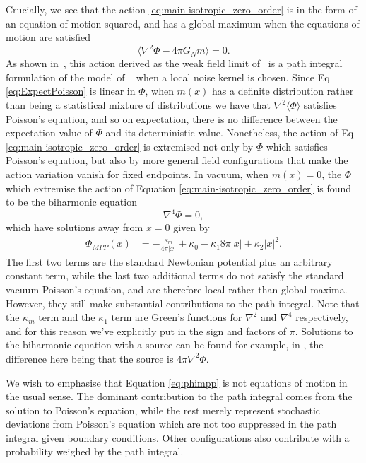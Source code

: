 \documentclass[aps,pra,amsmath,amssymb,amsthm,floatfix,nofootinbib,notitlepage,superscriptaddress,10pt]{revtex4-2}
\begin{document}
Crucially, we see that the action \eqref{eq:main-isotropic_zero_order} is in the form of an equation of motion squared, and has a global maximum when the equations of motion are satisfied
\begin{equation}
   \langle \nabla^2\Phi -4\pi G_N m\rangle=0.
    \label{eq:ExpectPoisson}
\end{equation}
As shown in~\cite{layton2023weak}, this action derived as the weak field limit of~\cite{oppenheim2018post,oppenheim2023covariant} is a path integral formulation of the model of ~\cite{tilloy2016sourcing} when a local noise kernel is chosen.
Since Eq \eqref{eq:ExpectPoisson} is linear in $\Phi$, when $m(x)$ has a definite distribution rather than being a statistical mixture of distributions we have that $\nabla^2\langle\Phi\rangle$ satisfies Poisson's equation, and so on expectation, there is no difference between the expectation value of $\Phi$ and its deterministic value.
Nonetheless, the action of Eq \eqref{eq:main-isotropic_zero_order} is extremised not only by $\Phi$ which satisfies Poisson's equation, but also by more general field configurations that make the action variation vanish for fixed endpoints. In vacuum, when $m(x)=0$, the $\Phi$ which extremise the action of Equation \eqref{eq:main-isotropic_zero_order} is found to be the biharmonic equation
 \begin{equation}
    \nabla^4\Phi=0,
    \label{eq:biharmonic}
\end{equation}
which have solutions away from $x=0$ given by  
\begin{align}
	\Phi_{MPP}(x)&= -\frac{\kappa_m}{4\pi|x|} + \kappa_0 - \kappa_1 8\pi |x|  + \kappa_2 |x|^2 .
\label{eq:phimpp}
\end{align}
The first two terms are the standard Newtonian potential plus an arbitrary constant term, while the last two additional terms do not satisfy the standard vacuum Poisson's equation, and are therefore local rather than global maxima. However, they still make substantial contributions to the path integral. Note that the $\kappa_m$ term and the $\kappa_1$ term are Green's functions for $\nabla^2$ and $\nabla^4$ respectively,  and for this reason we've explicitly put in the sign and factors of $\pi$. Solutions to the biharmonic equation with a source can be found for example, in \cite{mannheim1994newtonian}, the difference here being that the source
is $4\pi\nabla^2\Phi$.

We wish to emphasise that Equation \eqref{eq:phimpp} is not equations of motion in the usual sense.  The dominant contribution to the path integral comes from the solution to Poisson's equation, while the rest merely represent stochastic deviations from Poisson's equation which are not too suppressed in the path integral given boundary conditions. Other configurations also contribute with a probability weighed by the path integral.
\end{document}
